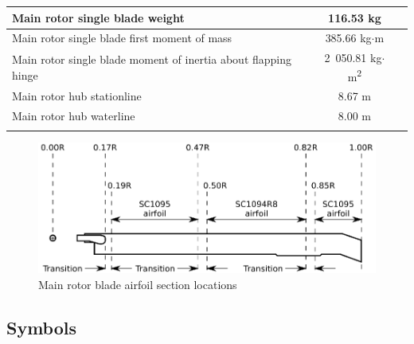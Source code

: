 \begin{tabularx}{\textwidth}{ | L | c | c | }
  Main rotor single blade weight        & 116.53 kg        & \cite{NASA-CR-166309} \\ \hline
  Main rotor single blade first moment of mass & 385.66 kg$\cdot$m & \cite{NASA-CR-166309} \\ \hline
  Main rotor single blade moment of inertia about flapping hinge & 2~050.81 kg$\cdot$m\textsuperscript{2} & \cite{NASA-CR-166309} \\ \hline
  Main rotor hub stationline            & 8.67 m           & \cite{UH60_MaintenanceManual} \\ \hline
  Main rotor hub waterline              & 8.00 m           & \cite{UH60_MaintenanceManual} \\ \hline
  \caption{Main rotor data}
\end{tabularx}

\begin{figure}[h!]
  \centering
  \includegraphics[width=120mm]{eps/uh60_blade_1.eps}
  \caption{Main rotor blade airfoil section locations \cite{NASA-TM-103985}}
\end{figure}


\clearpage
\subsection{Symbols}

